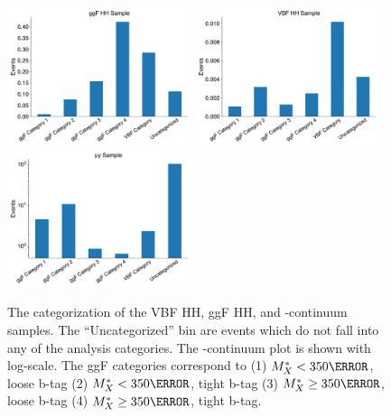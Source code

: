 \begin{figure}
  \centering
  \includegraphics[width=0.48\textwidth]{chapters/chapter6_vbf/images/category_breakdown/ggf_sample.pdf}
  \includegraphics[width=0.48\textwidth]{chapters/chapter6_vbf/images/category_breakdown/vbf_sample.pdf}
  \includegraphics[width=0.48\textwidth]{chapters/chapter6_vbf/images/category_breakdown/yy_sample.pdf}
  \caption[The categorization of the VBF HH, ggF HH, and \yy-continuum samples]{The categorization of the VBF HH, ggF HH, and \yy-continuum samples. The ``Uncategorized'' bin are events which do not fall into any of the analysis categories. The \yy-continuum plot is shown with log-scale. The \gls{ggF} categories correspond to (1) $M_X^{*} < \unit{350}{\GeV}$, loose b-tag (2) $M_X^{*} < \unit{350}{\GeV}$, tight b-tag (3) $M_X^{*} \geq \unit{350}{\GeV}$, loose b-tag (4) $M_X^{*} \geq \unit{350}{\GeV}$, tight b-tag.
  \label{fig:process-categorization}}
\end{figure}



